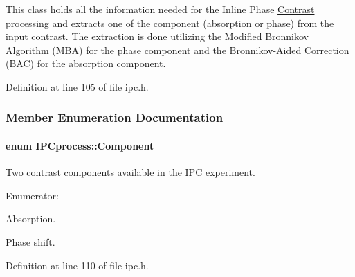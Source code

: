 This class holds all the information needed for the Inline Phase \hyperlink{classContrast}{Contrast} processing and extracts one of the component (absorption or phase) from the input contrast. The extraction is done utilizing the Modified Bronnikov Algorithm (MBA) for the phase component and the Bronnikov-\/Aided Correction (BAC) for the absorption component. 

Definition at line 105 of file ipc.h.



\subsubsection{Member Enumeration Documentation}
\hypertarget{classIPCprocess_a9e159369437f40cc3340171a0f6d3418}{
\paragraph[{Component}]{\setlength{\rightskip}{0pt plus 5cm}enum {\bf IPCprocess::Component}}\hfill}
\label{classIPCprocess_a9e159369437f40cc3340171a0f6d3418}


Two contrast components available in the IPC experiment. 

\begin{Desc}
\item[Enumerator: ]\par
\begin{description}
\item[{\em 
\hypertarget{classIPCprocess_a9e159369437f40cc3340171a0f6d3418a540b36da226dad86da1395d70355f98c}{
ABS}
\label{classIPCprocess_a9e159369437f40cc3340171a0f6d3418a540b36da226dad86da1395d70355f98c}
}]Absorption. \item[{\em 
\hypertarget{classIPCprocess_a9e159369437f40cc3340171a0f6d3418aafcace9e0a0649cf8e5ff4378c6c15bb}{
PHS}
\label{classIPCprocess_a9e159369437f40cc3340171a0f6d3418aafcace9e0a0649cf8e5ff4378c6c15bb}
}]Phase shift. \end{description}
\end{Desc}



Definition at line 110 of file ipc.h.



